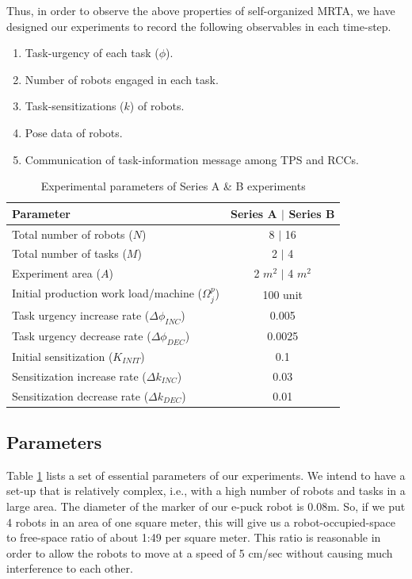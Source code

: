 \documentclass[smallcondensed]{svjour3}
\begin{document}
Thus, in order to observe the above properties of self-organized MRTA, we have designed our experiments to record the following  observables in each time-step.
\begin{enumerate}
\item Task-urgency of each task ($\phi$).
\item Number of robots engaged in each task.
\item Task-sensitizations ($k$) of robots.
\item Pose data of robots.
\item Communication of task-information message among TPS and RCCs.  
\end{enumerate}
\begin{table}
\caption{Experimental parameters of Series A \& B experiments}
\label{table:params}
\begin{center}
\begin{tabular}{|p{2in}|c|}
\hline Parameter & Series A $\mid$ Series B\\
\hline Total number of robots ($N$) & \hspace*{0.1cm} 8 $\mid$ 16\\
\hline Total number of tasks ($M$) & 2 $\mid$ 4\\
\hline Experiment area ($A$) & 2 $m^2$ $\mid$  4 $m^2$\\
\hline Initial production work load/machine ($\Omega_{j}^{p}$) & 100 unit \\
\hline Task urgency increase rate ($\Delta\phi_{INC}$) & 0.005\\
\hline Task urgency decrease rate ($\Delta\phi_{DEC}$) & 0.0025\\
\hline Initial sensitization ($K_{INIT}$) & 0.1\\
\hline Sensitization increase rate ($\Delta k_{INC}$) & 0.03\\
\hline Sensitization decrease rate ($\Delta k_{DEC}$) & 0.01\\
\hline
\end{tabular}
\end{center}
\end{table}
\subsection{Parameters}
Table \ref{table:params} lists a set of essential parameters of our experiments. We intend to have a set-up that is relatively complex, i.e., with a high number of robots and tasks in a large area. The diameter of the marker of our e-puck robot is 0.08m. So, if we put 4 robots in an area of one square meter, this will give us a robot-occupied-space to free-space ratio of about 1:49 per square meter. This ratio is reasonable in order to allow the robots to move at a speed of 5 cm/sec without causing much interference to each other. 
\end{document}
